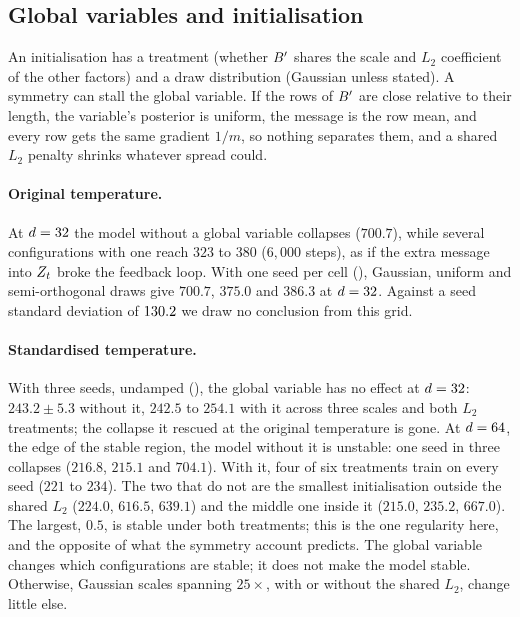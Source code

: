\begin{table}[t]
\centering\footnotesize

\caption{Validation perplexity against the rank $\krank$ of the arc scores; three seeds,
standardised temperature, undamped, $6{,}000$ steps.}
\label{tab:rank}
\end{table}

\subsection{Global variables and initialisation}
\label{app:grid-globalhead}
\label{app:grid-init}

An initialisation has a treatment (whether $B'$ shares the scale and $L_2$ coefficient of the
other factors) and a draw distribution (Gaussian unless stated). A symmetry can stall the global
variable. If the rows of $B'$ are close relative to their length, the variable's posterior is
uniform, the message is the row mean, and every row gets the same gradient $1/m$, so nothing
separates them, and a shared $L_2$ penalty shrinks whatever spread could.

\paragraph{Original temperature.}
At $d=32$ the model without a global variable collapses ($700.7$), while several
configurations with one reach $323$ to $380$ ($6{,}000$ steps), as if the extra message into
$Z_{t}$ broke the feedback loop. With one seed per cell (), Gaussian, uniform and semi-orthogonal draws give
$700.7$, $375.0$ and $386.3$ at $d=32$. Against a seed standard deviation of
$130.2$ we draw no conclusion from this grid.

\paragraph{Standardised temperature.}
With three seeds, undamped (), the global variable has no effect at
$d=32$: $243.2\pm5.3$ without it, $242.5$ to $254.1$ with it across three scales and both
$L_2$ treatments; the collapse it rescued at the original temperature is gone. At $d=64$, the edge of the stable region, the model without it is unstable: one seed in
three collapses ($216.8$, $215.1$ and $704.1$). With it, four of six treatments train on every seed
($221$ to $234$). The two that do not are the smallest initialisation outside the shared $L_2$
($224.0$, $616.5$, $639.1$) and the middle one inside it ($215.0$, $235.2$, $667.0$). The largest,
$0.5$, is stable under both treatments; this is the one regularity here, and the opposite of what
the symmetry account predicts. The
global variable changes which configurations are stable; it does not make the model stable.
Otherwise, Gaussian scales spanning $25\times$, with or without the shared $L_2$, change little
else.

